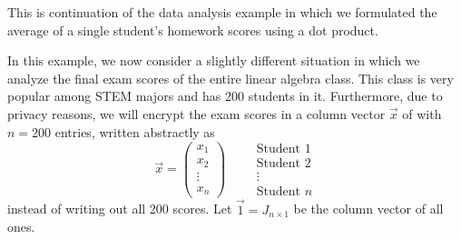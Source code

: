 \documentclass{ximera}
\begin{document}
\begin{example}
  This is continuation of the data analysis example in which we
  formulated the average of a single student's homework scores using a
  dot product.

  In this example, we now consider a slightly different situation in
  which we analyze the final exam scores of the entire linear algebra
  class. This class is very popular among STEM majors and has 200
  students in it. Furthermore, due to privacy reasons, we will encrypt
  the exam scores in a column vector $\vec{x}$ of with $n=200$
  entries, written abstractly as
  \[
    \vec{x} =
    \begin{pmatrix}
      x_1 \\ x_2 \\ \vdots \\ x_n
    \end{pmatrix}
    \qquad
    \begin{array}{l}
      \text{Student $1$}\\
      \text{Student $2$}\\
      \vdots \\
      \text{Student $n$}
    \end{array}
  \]
  instead of writing out all 200 scores. Let $\vec{1} = J_{n \times 1}$ be
  the column vector of all ones.


\end{example}
\end{document}

